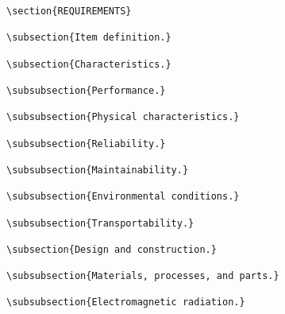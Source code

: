 \begin{itemize}
\begin{small}
\begin{verbatim}
\section{REQUIREMENTS}

\subsection{Item definition.}

\subsection{Characteristics.}

\subsubsection{Performance.}

\subsubsection{Physical characteristics.}

\subsubsection{Reliability.}

\subsubsection{Maintainability.}

\subsubsection{Environmental conditions.}

\subsubsection{Transportability.}

\subsection{Design and construction.}

\subsubsection{Materials, processes, and parts.}

\subsubsection{Electromagnetic radiation.}


\end{verbatim}
\end{small}
\end{itemize}
